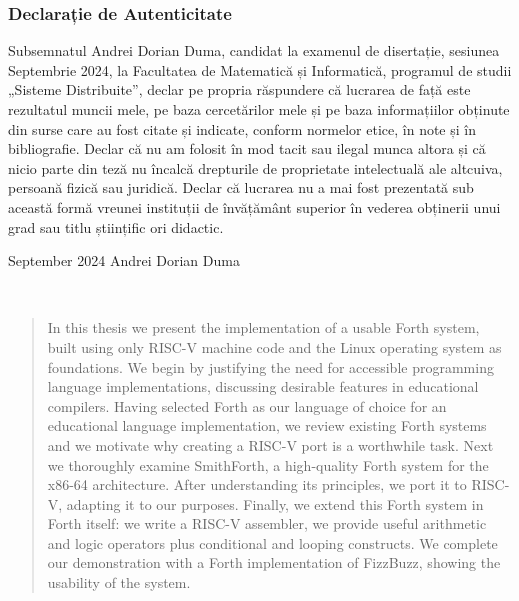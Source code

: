 \documentclass[a4paper,12pt,final]{article}
\begin{document}
\vspace{1cm}

\subsubsection*{Declarație de Autenticitate}
Subsemnatul Andrei Dorian Duma, candidat la examenul de disertație,
sesiunea Septembrie 2024, la Facultatea de Matematică și Informatică,
programul de studii „Sisteme Distribuite”, declar pe propria
răspundere că lucrarea de față este rezultatul muncii mele, pe baza
cercetărilor mele și pe baza informațiilor obținute din surse care au
fost citate și indicate, conform normelor etice, în note și în
bibliografie. Declar că nu am folosit în mod tacit sau ilegal munca
altora și că nicio parte din teză nu încalcă drepturile de
proprietate intelectuală ale altcuiva, persoană fizică sau
juridică. Declar că lucrarea nu a mai fost prezentată sub această
formă vreunei instituții de învățământ superior în vederea obținerii
unui grad sau titlu științific ori didactic.

\vspace{2cm}

\noindent
September 2024 \hfill{} Andrei Dorian Duma

\vspace{3cm}

\vspace*{\fill}
\clearpage \ \clearpage


\vspace*{\fill}

\renewcommand{\abstractname}{Abstract}
\begin{abstract}
In this thesis we present the implementation of a usable Forth system,
built using only RISC-V machine code and the Linux operating system as
foundations.  We begin by justifying the need for accessible
programming language implementations, discussing desirable features in
educational compilers.  Having selected Forth as our language of
choice for an educational language implementation, we review existing
Forth systems and we motivate why creating a RISC-V port is a
worthwhile task.  Next we thoroughly examine SmithForth, a
high-quality Forth system for the x86-64 architecture.  After
understanding its principles, we port it to RISC-V, adapting it to our
purposes.  Finally, we extend this Forth system in Forth itself: we
write a RISC-V assembler, we provide useful arithmetic and logic
operators plus conditional and looping constructs.  We complete our
demonstration with a Forth implementation of FizzBuzz, showing the
usability of the system.
\end{abstract}
\end{document}
